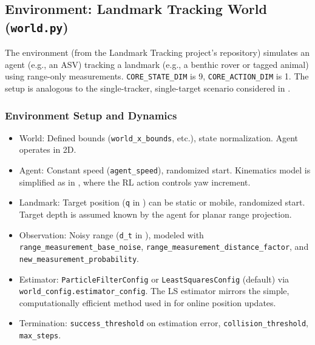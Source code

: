 \documentclass[11pt,a4paper]{article}
\newcommand{\code}[1]{\texttt{#1}} %
\begin{document}
\subsection{Environment: Landmark Tracking World (\code{world.py})}
The environment (from the Landmark Tracking project's repository) simulates an agent (e.g., an ASV) tracking a landmark (e.g., a benthic rover or tagged animal) using range-only measurements. \code{CORE\_STATE\_DIM} is 9, \code{CORE\_ACTION\_DIM} is 1. The setup is analogous to the single-tracker, single-target scenario considered in \cite{masmitja2023tracking}.

\subsubsection{Environment Setup and Dynamics}
\begin{itemize}
    \item World: Defined bounds (\code{world\_x\_bounds}, etc.), state normalization. Agent operates in 2D.
    \item Agent: Constant speed (\code{agent\_speed}), randomized start. Kinematics model is simplified as in \cite{masmitja2023tracking}, where the RL action controls yaw increment.
    \item Landmark: Target position (\code{q} in \cite{masmitja2023tracking}) can be static or mobile, randomized start. Target depth is assumed known by the agent for planar range projection.
    \item Observation: Noisy range (\code{d_t} in \cite{masmitja2023tracking}), modeled with \code{range\_measurement\_base\_noise}, \code{range\_measurement\_distance\_factor}, and \code{new\_measurement\_probability}.
    \item Estimator: \code{ParticleFilterConfig} or \code{LeastSquaresConfig} (default) via \code{world\_config.estimator\_config}. The LS estimator mirrors the simple, computationally efficient method used in \cite{masmitja2023tracking} for online position updates.
    \item Termination: \code{success\_threshold} on estimation error, \code{collision\_threshold}, \code{max\_steps}.
\end{itemize}
\end{document}
